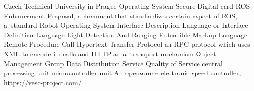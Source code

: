      {Czech Technical University in Prague}
      {Operating System}
 {Secure Digital card}
     {ROS Enhancement Proposal, a document that standardizes certain aspect of ROS, a~standard}
     {Robot Operating System}
     {Interface Description Language or Interface Definition Language}
   {Light Detection And Ranging}
     {Extensible Markup Language}
     {Remote Procedure Call}
    {Hypertext Transfer Protocol}
 {an RPC protocol which uses XML to encode its calls and HTTP as~a~transport mechanism}
     {Object Management Group}
     {Data Distribution Service}
     {Quality of Service}
     {central processing unit}
     {microcontroller unit}
    {An opensource electronic speed controller, \url{https://vesc-project.com/}}

